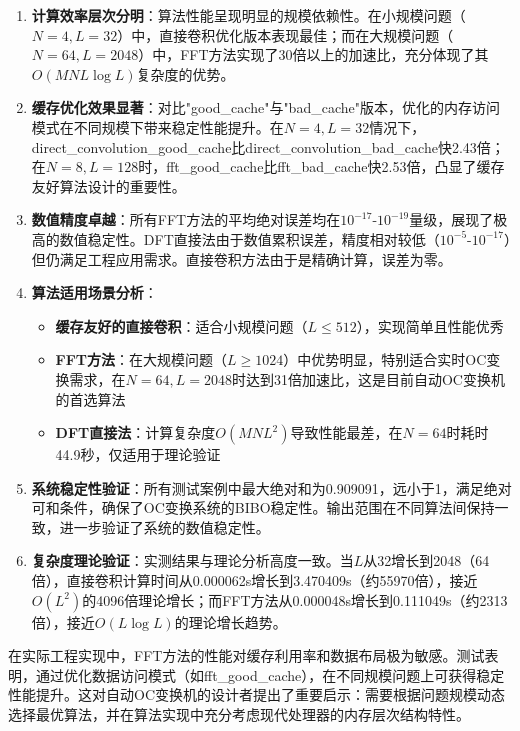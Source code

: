 \begin{enumerate}
    \item \textbf{计算效率层次分明}：算法性能呈现明显的规模依赖性。在小规模问题（$N=4,L=32$）中，直接卷积优化版本表现最佳；而在大规模问题（$N=64,L=2048$）中，FFT方法实现了30倍以上的加速比，充分体现了其$O(MNL\log L)$复杂度的优势。

    \item \textbf{缓存优化效果显著}：对比"good\_cache"与"bad\_cache"版本，优化的内存访问模式在不同规模下带来稳定性能提升。在$N=4,L=32$情况下，direct\_convolution\_good\_cache比direct\_convolution\_bad\_cache快2.43倍；在$N=8,L=128$时，fft\_good\_cache比fft\_bad\_cache快2.53倍，凸显了缓存友好算法设计的重要性。

    \item \textbf{数值精度卓越}：所有FFT方法的平均绝对误差均在$10^{-17}$-$10^{-19}$量级，展现了极高的数值稳定性。DFT直接法由于数值累积误差，精度相对较低（$10^{-5}$-$10^{-17}$）但仍满足工程应用需求。直接卷积方法由于是精确计算，误差为零。

    \item \textbf{算法适用场景分析}：
          \begin{itemize}
              \item \textbf{缓存友好的直接卷积}：适合小规模问题（$L \leq 512$），实现简单且性能优秀
              \item \textbf{FFT方法}：在大规模问题（$L \geq 1024$）中优势明显，特别适合实时OC变换需求，在$N=64,L=2048$时达到31倍加速比，这是目前自动OC变换机的首选算法
              \item \textbf{DFT直接法}：计算复杂度$O(MNL^2)$导致性能最差，在$N=64$时耗时44.9秒，仅适用于理论验证
          \end{itemize}

    \item \textbf{系统稳定性验证}：所有测试案例中最大绝对和为0.909091，远小于1，满足绝对可和条件，确保了OC变换系统的BIBO稳定性。输出范围在不同算法间保持一致，进一步验证了系统的数值稳定性。

    \item \textbf{复杂度理论验证}：实测结果与理论分析高度一致。当$L$从32增长到2048（64倍），直接卷积计算时间从0.000062s增长到3.470409s（约55970倍），接近$O(L^2)$的4096倍理论增长；而FFT方法从0.000048s增长到0.111049s（约2313倍），接近$O(L\log L)$的理论增长趋势。
\end{enumerate}

在实际工程实现中，FFT方法的性能对缓存利用率和数据布局极为敏感。测试表明，通过优化数据访问模式（如fft\_good\_cache），在不同规模问题上可获得稳定性能提升。这对自动OC变换机的设计者提出了重要启示：需要根据问题规模动态选择最优算法，并在算法实现中充分考虑现代处理器的内存层次结构特性。

